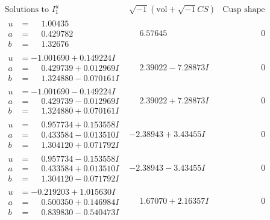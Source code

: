 \documentclass[1p]{elsarticle_modified}
\theoremstyle{definition}
\newcommand{\I}{\sqrt{-1}}
\begin{document}
$$\begin{array}{c|c|c}  
\text{Solutions to }I^u_{1}& \I (\text{vol} + \sqrt{-1}CS) & \text{Cusp shape}\\
 \hline 
\begin{aligned}
u &= \phantom{-}1.00435\phantom{ +0.000000I} \\
a &= \phantom{-}0.429782\phantom{ +0.000000I} \\
b &= \phantom{-}1.32676\phantom{ +0.000000I}\end{aligned}
 & \phantom{-}6.57645\phantom{ +0.000000I} & \phantom{-0.000000 } 0 \\ \hline\begin{aligned}
u &= -1.001690 + 0.149224 I \\
a &= \phantom{-}0.429739 + 0.012969 I \\
b &= \phantom{-}1.324880 - 0.070161 I\end{aligned}
 & \phantom{-}2.39022 - 7.28873 I & \phantom{-0.000000 } 0 \\ \hline\begin{aligned}
u &= -1.001690 - 0.149224 I \\
a &= \phantom{-}0.429739 - 0.012969 I \\
b &= \phantom{-}1.324880 + 0.070161 I\end{aligned}
 & \phantom{-}2.39022 + 7.28873 I & \phantom{-0.000000 } 0 \\ \hline\begin{aligned}
u &= \phantom{-}0.957734 + 0.153558 I \\
a &= \phantom{-}0.433584 - 0.013510 I \\
b &= \phantom{-}1.304120 + 0.071792 I\end{aligned}
 & -2.38943 + 3.43455 I & \phantom{-0.000000 } 0 \\ \hline\begin{aligned}
u &= \phantom{-}0.957734 - 0.153558 I \\
a &= \phantom{-}0.433584 + 0.013510 I \\
b &= \phantom{-}1.304120 - 0.071792 I\end{aligned}
 & -2.38943 - 3.43455 I & \phantom{-0.000000 } 0 \\ \hline\begin{aligned}
u &= -0.219203 + 1.015630 I \\
a &= \phantom{-}0.500350 + 0.146984 I \\
b &= \phantom{-}0.839830 - 0.540473 I\end{aligned}
 & \phantom{-}1.67070 + 2.16357 I & \phantom{-0.000000 } 0 \\ \hline\begin{aligned}

\end{aligned}
\end{array}$$
\end{document}
